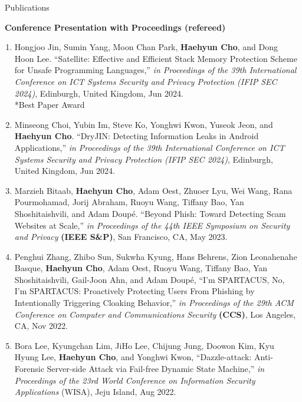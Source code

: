\documentclass{resume} %
\begin{document}
\begin{rSection}{\faGenderless~Publications}



    \strut\textbullet~{\bf Conference Presentation with Proceedings (refereed)}
    \begin{enumerate}[leftmargin=0pt]
    	\item Hongjoo Jin, Sumin Yang, Moon Chan Park, \textbf{Haehyun Cho}, and Dong Hoon Lee.
    	``Satellite: Effective and Efficient Stack Memory Protection Scheme for Unsafe Programming Languages,''
    	\emph{in Proceedings of the 39th International Conference on ICT Systems Security and Privacy Protection (IFIP SEC 2024)},
    	Edinburgh, United Kingdom, Jun 2024.\\
    	{*}Best Paper Award

    	\item Minseong Choi, Yubin Im, Steve Ko, Yonghwi Kwon, Yuseok Jeon, and \textbf{Haehyun Cho}.
    	``DryJIN: Detecting Information Leaks in Android Applications,''
    	\emph{in Proceedings of the 39th International Conference on ICT Systems Security and Privacy Protection (IFIP SEC 2024)},
    	Edinburgh, United Kingdom, Jun 2024.

		\item Marzieh Bitaab, \textbf{Haehyun Cho}, Adam Oest, Zhuoer Lyu, Wei Wang, Rana Pourmohamad, Jorij Abraham, Ruoyu Wang, Tiffany Bao, Yan Shoshitaishvili, and Adam Doup\'e.
		``Beyond Phish: Toward Detecting Scam Websites at Scale,''
		\emph{in Proceedings of the 44th IEEE Symposium on Security and Privacy} \textbf{(IEEE S\&P)},
    	San Francisco, CA, May 2023.
		
		\item Penghui Zhang, Zhibo Sun, Sukwha Kyung, Hans Behrens, Zion Leonahenahe Basque, \textbf{Haehyun Cho}, Adam Oest, Ruoyu Wang, Tiffany Bao, Yan Shoshitaishvili, Gail-Joon Ahn, and Adam Doup\'e, 
		``I'm SPARTACUS, No, I'm SPARTACUS: Proactively Protecting Users From Phishing by Intentionally Triggering Cloaking Behavior,''
		\emph{in Proceedings of the 29th ACM Conference on Computer and Communications Security} \textbf{(CCS)},
		Los Angeles, CA, Nov 2022.

		\item Bora Lee, Kyungchan Lim, JiHo Lee, Chijung Jung, Doowon Kim, Kyu Hyung Lee, \textbf{Haehyun Cho}, and Yonghwi Kwon,
		``Dazzle-attack: Anti-Forensic Server-side Attack via Fail-free Dynamic State Machine,''
		\emph{in Proceedings of the 23rd World Conference on Information Security Applications} (WISA), 
		Jeju Island, Aug 2022.
		

\end{enumerate}
\end{rSection}
\end{document}
